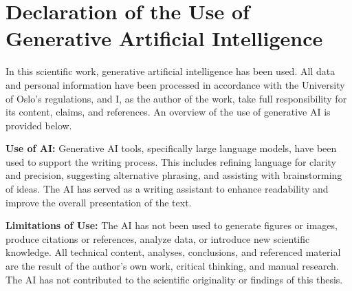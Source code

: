 \chapter{Declaration of the Use of Generative Artificial Intelligence}

In this scientific work, generative artificial intelligence has been used. All data and personal information have been processed in accordance with the University of Oslo's regulations, and I, as the author of the work, take full responsibility for its content, claims, and references. An overview of the use of generative AI is provided below.

\vspace{2em}

\textbf{Use of AI:}
Generative AI tools, specifically large language models, have been used to support the writing process. This includes refining language for clarity and precision, suggesting alternative phrasing, and assisting with brainstorming of ideas. The AI has served as a writing assistant to enhance readability and improve the overall presentation of the text.

\vspace{2em}

\textbf{Limitations of Use:}
The AI has not been used to generate figures or images, produce citations or references, analyze data, or introduce new scientific knowledge. All technical content, analyses, conclusions, and referenced material are the result of the author's own work, critical thinking, and manual research. The AI has not contributed to the scientific originality or findings of this thesis.
